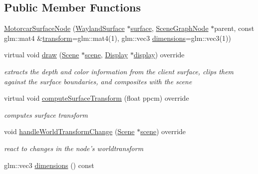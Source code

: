 \subsection*{Public Member Functions}
\begin{DoxyCompactItemize}
\item 
\hyperlink{classmotorcar_1_1MotorcarSurfaceNode_aab75702ea552e4d9df6edece3dcd5328}{Motorcar\-Surface\-Node} (\hyperlink{classmotorcar_1_1WaylandSurface}{Wayland\-Surface} $\ast$\hyperlink{simple-egl_8cpp_a0720952aa1caded45b5bcdce589663a9}{surface}, \hyperlink{classmotorcar_1_1SceneGraphNode}{Scene\-Graph\-Node} $\ast$parent, const glm\-::mat4 \&\hyperlink{classmotorcar_1_1SceneGraphNode_ad96e79fdd739ac8223a3128003be391a}{transform}=glm\-::mat4(1), glm\-::vec3 \hyperlink{classmotorcar_1_1MotorcarSurfaceNode_a83b83213c56f85783a948e28fb5b11b0}{dimensions}=glm\-::vec3(1))
\item 
virtual void \hyperlink{classmotorcar_1_1MotorcarSurfaceNode_afe8227366d3644d09d13c905ff2d86a8}{draw} (\hyperlink{classmotorcar_1_1Scene}{Scene} $\ast$\hyperlink{classmotorcar_1_1SceneGraphNode_aa14e637ed4ae98f77e28941a4b5cfdd8}{scene}, \hyperlink{classmotorcar_1_1Display}{Display} $\ast$\hyperlink{structdisplay}{display}) override
\begin{DoxyCompactList}\small\item\em extracts the depth and color information from the client surface, clips them against the surface boundaries, and composites with the scene \end{DoxyCompactList}\item 
virtual void \hyperlink{classmotorcar_1_1MotorcarSurfaceNode_ab0c7df201ceb2d73c1077daf90574016}{compute\-Surface\-Transform} (float ppcm) override
\begin{DoxyCompactList}\small\item\em computes surface transform \end{DoxyCompactList}\item 
void \hyperlink{classmotorcar_1_1MotorcarSurfaceNode_a21eac7e80d2855fcb822541abc7f1965}{handle\-World\-Transform\-Change} (\hyperlink{classmotorcar_1_1Scene}{Scene} $\ast$\hyperlink{classmotorcar_1_1SceneGraphNode_aa14e637ed4ae98f77e28941a4b5cfdd8}{scene}) override
\begin{DoxyCompactList}\small\item\em react to changes in the node's worldtransform \end{DoxyCompactList}\item 
glm\-::vec3 \hyperlink{classmotorcar_1_1MotorcarSurfaceNode_a83b83213c56f85783a948e28fb5b11b0}{dimensions} () const 

\end{DoxyCompactItemize}
